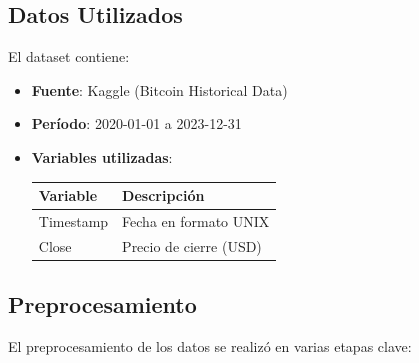 \documentclass[12pt]{article}
\begin{document}
\subsection{Datos Utilizados}
El dataset contiene:

\begin{itemize}
\item \textbf{Fuente}: Kaggle (Bitcoin Historical Data)
\item \textbf{Período}: 2020-01-01 a 2023-12-31
\item \textbf{Variables utilizadas}:
\begin{table}[H]
\centering
\begin{tabular}{ll}
\toprule
\textbf{Variable} & \textbf{Descripción} \\
\midrule
Timestamp & Fecha en formato UNIX \\
Close & Precio de cierre (USD) \\
\bottomrule
\end{tabular}
\end{table}
\end{itemize}


\bigskip
\subsection{Preprocesamiento}

El preprocesamiento de los datos se realizó en varias etapas clave:
\end{document}
